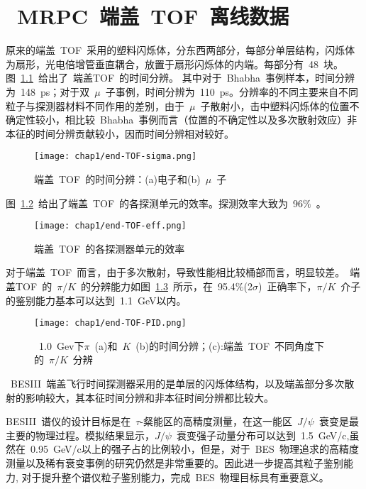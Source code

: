 \chapter{~MRPC~端盖~TOF~离线数据}
原来的端盖~TOF~采用的塑料闪烁体，分东西两部分，每部分单层结构，闪烁体为扇形，光电倍增管垂直耦合，放置于扇形闪烁体的内端。每部分有~48~块。
图~\ref{fig:end-TOF-sigma}~给出了~端盖TOF~的时间分辨。
其中对于~Bhabha~事例样本，时间分辨为~148~ps；对于双~$\mu$~子事例，时间分辨为~110~ps\cite{zhaoc:2011}。分辨率的不同主要来自不同粒子与探测器材料不同作用的差别，由于~$\mu$~子散射小，击中塑料闪烁体的位置不确定性较小，相比较~Bhabha~事例而言（位置的不确定性以及多次散射效应）非本征的时间分辨贡献较小，因而时间分辨相对较好。
\begin{figure}[!h]
  \centering
  \texttt{[image: chap1/end-TOF-sigma.png]}
  \caption{端盖~TOF~的时间分辨：(a)电子和(b)~$\mu$~子}
  \label{fig:end-TOF-sigma}
\end{figure}
图~\ref{fig:end-TOF-eff}~给出了端盖~TOF~的各探测单元的效率。探测效率大致为~96$\%$~\cite{wangxz2016}。
\begin{figure}[!h]
  \centering
  \texttt{[image: chap1/end-TOF-eff.png]}
  \caption{端盖~TOF~的各探测器单元的效率}
  \label{fig:end-TOF-eff}
\end{figure}

对于端盖~TOF~而言，由于多次散射，导致性能相比较桶部而言，明显较差。~端盖TOF~的~$\pi/K$~的分辨能力如图~\ref{fig:end-TOF-PID}~\cite{zhaoc:2011}所示，在~95.4$\%$(2$\sigma$)~正确率下，$\pi/K$~介子的鉴别能力基本可以达到~1.1~GeV以内。

\begin{figure}[!h]
  \centering
  \texttt{[image: chap1/end-TOF-PID.png]}
  \caption{~1.0~Gev下$\pi$~(a)和~$K$~(b)的时间分辨；(c):端盖~TOF~不同角度下的~$\pi/K$~分辨}
  \label{fig:end-TOF-PID}
\end{figure}

~BESIII~端盖飞行时间探测器采用的是单层的闪烁体结构，以及端盖部分多次散射的影响较大，其本征时间分辨和非本征时间分辨都比较大。

BESIII~谱仪的设计目标是在~$\tau$-粲能区的高精度测量，在这一能区~$J/\psi$~衰变是最主要的物理过程。模拟结果显示，$J/\psi$~衰变强子动量分布可以达到~1.5~GeV/c,虽然在~0.95~GeV/c以上的强子占的比例较小，但是，对于~BES~物理追求的高精度测量以及稀有衰变事例的研究仍然是非常重要的。因此进一步提高其粒子鉴别能力, 对于提升整个谱仪粒子鉴别能力，完成~BES~物理目标具有重要意义。

